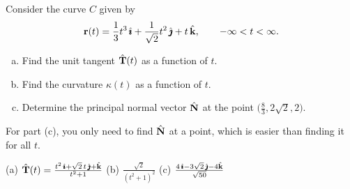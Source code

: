 \begin{question}[M317 2008A] %
Consider the curve $C$ given by
\begin{equation*}
\mathbf{r}(t) = \frac{1}{3} t^3\,\hat{\pmb{\imath}} + \frac{1}{\sqrt{2}} t^2\,\hat{\pmb{\jmath}} + t\,\hat{\mathbf{k}},\qquad
-\infty < t < \infty.
\end{equation*}
\begin{enumerate}[(a)]
\item
Find the unit tangent $\hat{\mathbf{T}}(t)$ as a function of $t$.
\item
Find the curvature $\kappa(t)$ as a function of $t$.
\item
Determine the principal normal vector $\hat{\mathbf{N}}$ at the point 
$\big(\frac{8}{3} , 2\sqrt{2}, 2\big)$.
\end{enumerate}
\end{question}

\begin{hint} 
For part (c), you only need to find $\hat{\mathbf{N}}$ at a point, which is easier than finding it for all $t$.
\end{hint}

\begin{answer} 
(a) $\hat{\mathbf{T}}(t) = \frac{t^2\,\hat{\pmb{\imath}} +\sqrt{2}\,t\,\hat{\pmb{\jmath}} +\hat{\mathbf{k}}}{t^2+1}$\qquad
(b) $\frac{\sqrt{2}} {{(t^2+1)}^2}$\qquad
(c) $\frac{4\,\hat{\pmb{\imath}} -3\sqrt{2}\,\hat{\pmb{\jmath}} -4\hat{\mathbf{k}}}{\sqrt{50}}$
\end{answer}


